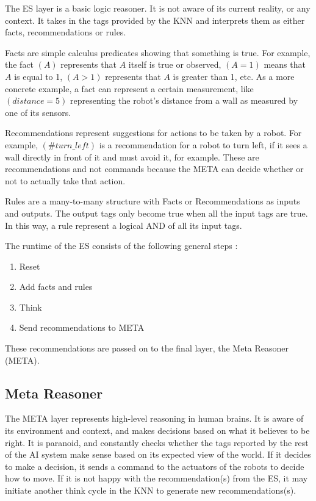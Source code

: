 \documentclass[titlepage,11pt]{article}
\begin{document}
The ES layer is a basic logic reasoner. It is not aware of its current reality, or any context. It takes in the tags provided by the KNN and interprets them as either facts, recommendations or rules.

Facts are simple calculus predicates showing that something is true. For example, the fact $(A)$ represents that $A$ itself is true or observed, $(A = 1)$ means that $A$ is equal to 1, $(A > 1)$ represents that $A$ is greater than 1, etc. As a more concrete example, a fact can represent a certain measurement, like $(distance = 5)$ representing the robot's distance from a wall as measured by one of its sensors.

Recommendations represent suggestions for actions to be taken by a robot. For example, $(\#turn\_left)$ is a recommendation for a robot to turn left, if it sees a wall directly in front of it and must avoid it, for example. These are recommendations and not commands because the META can decide whether or not to actually take that action.

Rules are a many-to-many structure with Facts or Recommendations as inputs and outputs. The output tags only become true when all the input tags are true. In this way, a rule represent a logical AND of all its input tags.

The runtime of the ES consists of the following general steps \cite{vybihal-expert}:

\begin{enumerate}
	\item Reset
	\item Add facts and rules
	\item Think
	\item Send recommendations to META
\end{enumerate}

These recommendations are passed on to the final layer, the Meta Reasoner (META).

\subsection{Meta Reasoner}

The META layer represents high-level reasoning in human brains. It is aware of its environment and context, and makes decisions based on what it believes to be right. It is paranoid, and constantly checks whether the tags reported by the rest of the AI system make sense based on its expected view of the world. If it decides to make a decision, it sends a command to the actuators of the robots to decide how to move. If it is not happy with the recommendation(s) from the ES, it may initiate another think cycle in the KNN to generate new recommendations(s).
\end{document}
